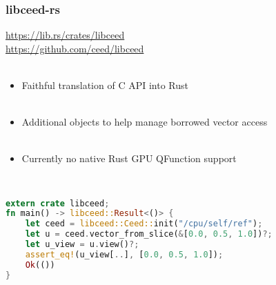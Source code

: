 \documentclass{beamer}
\begin{document}
\begin{frame}[fragile]
\begin{center}
\frametitle{libceed-rs}

\href{https://lib.rs/crates/libceed}{https://lib.rs/crates/libceed}\\

\href{https://github.com/ceed/libceed}{https://github.com/ceed/libceed}\\

~\\

\begin{itemize}

\item Faithful translation of C API into Rust\\

~\\

\item Additional objects to help manage borrowed vector access\\

~\\

\item Currently no native Rust GPU QFunction support\\

\end{itemize}

~\\

{\footnotesize
\begin{lstlisting}[language=Rust, style=boxedRust]
extern crate libceed;
fn main() -> libceed::Result<()> {
    let ceed = libceed::Ceed::init("/cpu/self/ref");
    let u = ceed.vector_from_slice(&[0.0, 0.5, 1.0])?;
    let u_view = u.view()?;
    assert_eq!(u_view[..], [0.0, 0.5, 1.0]);
    Ok(())
}
\end{lstlisting}
}

\end{center}
\end{frame}

\end{document}
